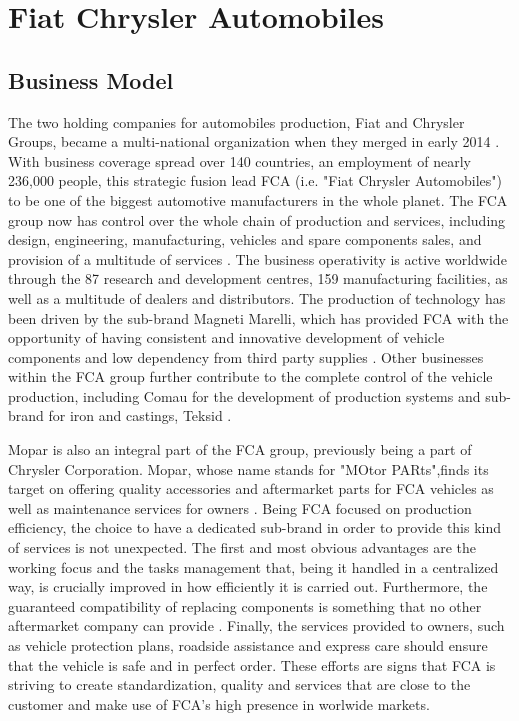 \section{Fiat Chrysler Automobiles}


\subsection{Business Model}
The two holding companies for automobiles production, Fiat and Chrysler Groups, became a multi-national organization when they merged in early 2014 \cite{fca_history}. With business coverage spread over 140 countries, an employment of nearly 236,000 people, this strategic fusion lead FCA (i.e. "Fiat Chrysler Automobiles") to be one of the biggest automotive manufacturers in the whole planet. The FCA group now has control over the whole chain of production and services, including design, engineering, manufacturing, vehicles and spare components sales, and provision of a multitude of services \cite{fca_overview}. The business operativity is active worldwide through the 87 research and development centres, 159 manufacturing facilities, as well as a multitude of dealers and distributors. The production of technology has been driven by the sub-brand Magneti Marelli, which has provided FCA with the opportunity of having consistent and innovative development of vehicle components and low dependency from third party supplies \cite{magneti_marelli}. Other businesses within the FCA group further contribute to the complete control of the vehicle production, including Comau for the development of production systems and sub-brand for iron and castings, Teksid \cite{fca_overview}.\n 

Mopar is also an integral part of the FCA group, previously being a part of Chrysler Corporation. Mopar, whose name stands for "MOtor PARts",finds its target on  offering quality accessories and aftermarket parts for FCA vehicles as well as maintenance services for owners \cite{fca_mopar}. Being FCA focused on production efficiency, the choice to have a dedicated sub-brand in order to provide this kind of services is not unexpected. The first and most obvious advantages are the working focus and the tasks management that, being it handled in a centralized way, is crucially improved in how efficiently it is carried out. Furthermore, the guaranteed compatibility of replacing components is something that no other aftermarket company can provide \cite{fca_mopar}. Finally, the services provided to owners, such as vehicle protection plans, roadside assistance and express care should ensure that the vehicle is safe and in perfect order. These efforts are signs that FCA is striving to create standardization, quality and services that are close to the customer and make use of FCA's high presence in worlwide markets.

